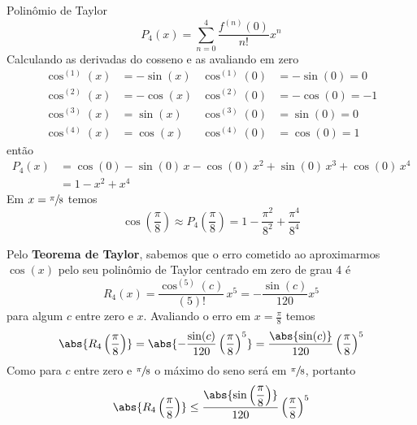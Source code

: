 \documentclass[a4paper,12pt,fleqn]{article}
\begin{document}
\begin{answer}
  Polinômio de Taylor
  \[
    P_4(x) = \sum_{n=0}^{4} \frac{f^{(n)}(0)}{n!} x^n
  \]
  Calculando as derivadas do cosseno e as avaliando em zero
  \begin{align*}
    \cos^{(1)}(x) & = -\sin(x) &
    \cos^{(1)}(0) & = -\sin(0) = 0 \\
    \cos^{(2)}(x) & = -\cos(x) &
    \cos^{(2)}(0) & = -\cos(0) = -1 \\
    \cos^{(3)}(x) & =  \sin(x) &
    \cos^{(3)}(0) & =  \sin(0) = 0 \\
    \cos^{(4)}(x) & =  \cos(x) &
    \cos^{(4)}(0) & =  \cos(0) = 1
  \end{align*}
  então
  \begin{align*}
    P_4(x)
    & = \cos(0)
    - \sin(0)\, x
    - \cos(0)\, x^2
    + \sin(0)\, x^3
    + \cos(0)\, x^4 \\
    & = 1 - x^2 + x^4
  \end{align*}
  Em \(x=\sfrac{\pi}{8}\) temos
  \[
    \cos\left(\frac{\pi}{8}\right)
    \approx
    P_4\left(\frac{\pi}{8}\right)
    = 1
    - \frac{\pi^2}{8^2}
    + \frac{\pi^4}{8^4}
  \]

  Pelo \textbf{Teorema de Taylor}, sabemos que o erro cometido ao aproximarmos
  $\cos(x)$ pelo seu polinômio de Taylor centrado em zero de grau 4 é
  \[
    R_4(x)
    = \frac{\cos^{(5)}(c)}{(5)!} \, x^5
    = -\frac{\sin(c)}{120}x^5
  \]
  para algum $c$ entre zero e $x$.
  Avaliando o erro em \(x=\frac{\pi}{8}\) temos
  \[
    \abs{R_4\left(\frac{\pi}{8}\right)}
    = \abs{-\frac{\sin(c)}{120}\left(\frac{\pi}{8}\right)^5}
    = \frac{\abs{\sin(c)}}{120}\left(\frac{\pi}{8}\right)^5
  \]
  Como para $c$ entre zero e \(\sfrac{\pi}{8}\) o máximo do seno será
  em \(\sfrac{\pi}{8}\), portanto
  \[
    \abs{R_4\left(\frac{\pi}{8}\right)}
    \leq \frac{\abs{\sin\left(\dfrac{\pi}{8}\right)}}{120}\left(\frac{\pi}{8}\right)^5
  \]
\end{answer}

\end{document}

